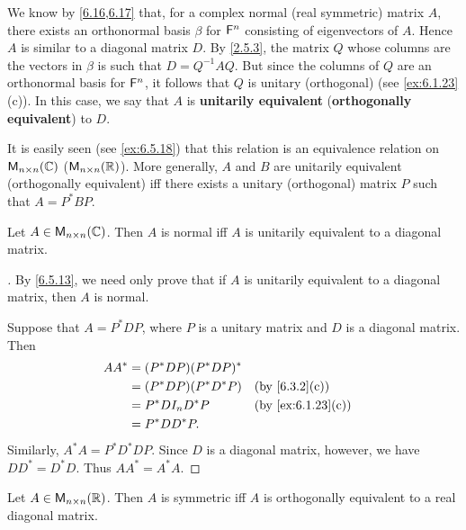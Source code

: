 \begin{defn}\label{6.5.13}
  We know by \cref{6.16,6.17} that, for a complex normal (real symmetric) matrix \(A\), there exists an orthonormal basis \(\beta\) for \(\mathsf{F}^n\) consisting of eigenvectors of \(A\).
  Hence \(A\) is similar to a diagonal matrix \(D\).
  By \cref{2.5.3}, the matrix \(Q\) whose columns are the vectors in \(\beta\) is such that \(D = Q^{-1} A Q\).
  But since the columns of \(Q\) are an orthonormal basis for \(\mathsf{F}^n\), it follows that \(Q\) is unitary (orthogonal) (see \cref{ex:6.1.23}(c)).
  In this case, we say that \(A\) is \textbf{unitarily equivalent} (\textbf{orthogonally equivalent}) to \(D\).

  It is easily seen (see \cref{ex:6.5.18}) that this relation is an equivalence relation on \(\ms[n][n][\C]\) (\(\ms[n][n][\R]\)).
  More generally, \(A\) and \(B\) are unitarily equivalent (orthogonally equivalent) iff there exists a unitary (orthogonal) matrix \(P\) such that \(A = P^* B P\).
\end{defn}

\begin{thm}\label{6.19}
  Let \(A \in \ms[n][n][\C]\).
  Then \(A\) is normal iff \(A\) is unitarily equivalent to a diagonal matrix.
\end{thm}

\begin{proof}[]
  By \cref{6.5.13}, we need only prove that if \(A\) is unitarily equivalent to a diagonal matrix, then \(A\) is normal.

  Suppose that \(A = P^* D P\), where \(P\) is a unitary matrix and \(D\) is a diagonal matrix.
  Then
  \begin{align*}
    A A^* & = (P^* D P) (P^* D P)^*                        \\
          & = (P^* D P) (P^* D^* P) &  & \by{6.3.2}[c]     \\
          & = P^* D I_n D^* P       &  & \by{ex:6.1.23}[c] \\
          & = P^* D D^* P.
  \end{align*}
  Similarly, \(A^* A = P^* D^* D P\).
  Since \(D\) is a diagonal matrix, however, we have \(D D^* = D^* D\).
  Thus \(A A^* = A^* A\).
\end{proof}

\begin{thm}\label{6.20}
  Let \(A \in \ms[n][n][\R]\).
  Then \(A\) is symmetric iff \(A\) is orthogonally equivalent to a real diagonal matrix.
\end{thm}

